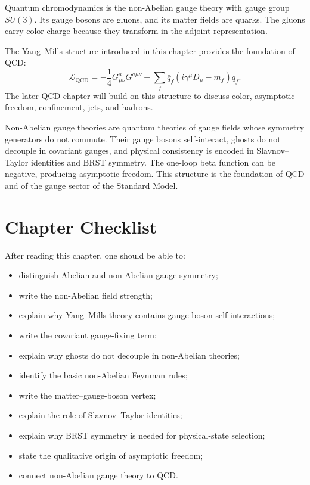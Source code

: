 Quantum chromodynamics is the non-Abelian gauge theory with gauge group
\(SU(3)\). Its gauge bosons are gluons, and its matter fields are quarks. The
gluons carry color charge because they transform in the adjoint representation.

The Yang--Mills structure introduced in this chapter provides the foundation of
QCD:
\[
    \mathcal{L}_{\mathrm{QCD}}
    = -\frac{1}{4}G_{\mu\nu}^aG^{a\mu\nu}
      +\sum_f\bar q_f(i\gamma^\mu D_\mu-m_f)q_f.
\]
The later QCD chapter will build on this structure to discuss color, asymptotic
freedom, confinement, jets, and hadrons.

\begin{summarybox}
Non-Abelian gauge theories are quantum theories of gauge fields whose symmetry
generators do not commute. Their gauge bosons self-interact, ghosts do not
decouple in covariant gauges, and physical consistency is encoded in
Slavnov--Taylor identities and BRST symmetry. The one-loop beta function can be
negative, producing asymptotic freedom. This structure is the foundation of QCD
and of the gauge sector of the Standard Model.
\end{summarybox}

\section{Chapter Checklist}

After reading this chapter, one should be able to:
\begin{itemize}
    \item distinguish Abelian and non-Abelian gauge symmetry;
    \item write the non-Abelian field strength;
    \item explain why Yang--Mills theory contains gauge-boson self-interactions;
    \item write the covariant gauge-fixing term;
    \item explain why ghosts do not decouple in non-Abelian theories;
    \item identify the basic non-Abelian Feynman rules;
    \item write the matter--gauge-boson vertex;
    \item explain the role of Slavnov--Taylor identities;
    \item explain why BRST symmetry is needed for physical-state selection;
    \item state the qualitative origin of asymptotic freedom;
    \item connect non-Abelian gauge theory to QCD.
\end{itemize}
